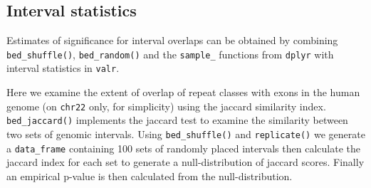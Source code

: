 \documentclass[9pt,a4paper]{extarticle}
\begin{document}
\subsection*{Interval statistics}\label{interval-statistics}

Estimates of significance for interval overlaps can be obtained by
combining \texttt{bed\_shuffle()}, \texttt{bed\_random()} and the
\texttt{sample\_} functions from \texttt{dplyr} with interval statistics
in \texttt{valr}.

Here we examine the extent of overlap of repeat classes with exons in
the human genome (on \texttt{chr22} only, for simplicity) using the
jaccard similarity index. \texttt{bed\_jaccard()} implements the jaccard
test to examine the similarity between two sets of genomic intervals.
Using \texttt{bed\_shuffle()} and \texttt{replicate()} we generate a
\texttt{data\_frame} containing 100 sets of randomly placed intervals
then calculate the jaccard index for each set to generate a
null-distribution of jaccard scores. Finally an empirical p-value is
then calculated from the null-distribution.
\end{document}
